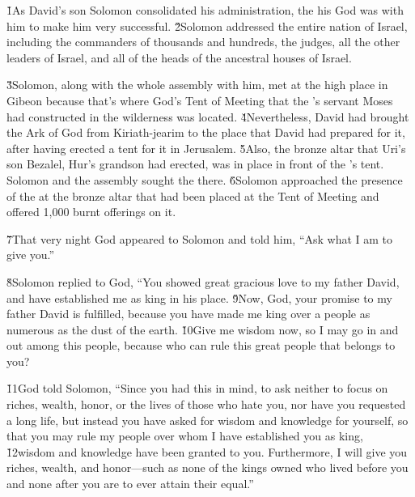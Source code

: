 


\v{1}As David's son Solomon consolidated his administration, the  his God was with him to make him very successful. \v{2}Solomon addressed the entire nation of Israel, including the commanders of thousands and hundreds, the judges, all the other leaders of Israel, and all of the heads of the ancestral houses of Israel.

\v{3}Solomon, along with the whole assembly with him, met at the high place in Gibeon because that's where God's Tent of Meeting that the 's servant Moses had constructed in the wilderness was located. \v{4}Nevertheless, David had brought the Ark of God from Kiriath-jearim to the place that David had prepared for it, after having erected a tent for it in Jerusalem. \v{5}Also, the bronze altar that Uri's son Bezalel, Hur's grandson had erected, was in place in front of the 's tent. Solomon and the assembly sought the  there. \v{6}Solomon approached the presence of the  at the bronze altar that had been placed at the Tent of Meeting and offered 1,000 burnt offerings on it.

\v{7}That very night God appeared to Solomon and told him, ``Ask what I am to give you.''

\v{8}Solomon replied to God, ``You showed great gracious love to my father David, and have established me as king in his place. \v{9}Now,  God, your promise to my father David is fulfilled, because you have made me king over a people as numerous as the dust of the earth. \v{10}Give me wisdom now, so I may go in and out among this people, because who can rule this great people that belongs to you?

\v{11}God told Solomon, ``Since you had this in mind, to ask neither to focus on riches, wealth, honor, or the lives of those who hate you, nor have you requested a long life, but instead you have asked for wisdom and knowledge for yourself, so that you may rule my people over whom I have established you as king, \v{12}wisdom and knowledge have been granted to you. Furthermore, I will give you riches, wealth, and honor---such as none of the kings owned who lived before you and none after you are to ever attain their equal.''


